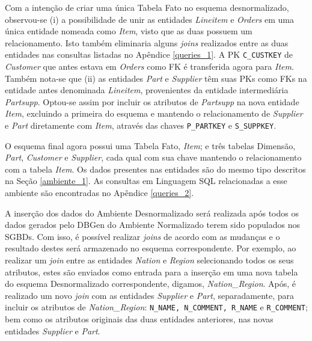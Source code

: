 Com a intenção de criar uma única Tabela Fato no esquema desnormalizado, observou-se (i) a possibilidade de unir as entidades \textit{Lineitem} e \textit{Orders} em uma única entidade nomeada como \textit{Item}, visto que as duas possuem um relacionamento. Isto também eliminaria alguns \textit{joins} realizados entre as duas entidades nas consultas listadas no Apêndice \ref{queries_1}. A PK \texttt{C\_CUSTKEY} de \textit{Customer} que antes estava em \textit{Orders} como FK é transferida agora para \textit{Item}. Também nota-se que (ii) as entidades \textit{Part} e \textit{Supplier} têm suas PKs como FKs na entidade antes denominada \textit{Lineitem}, provenientes da entidade intermediária \textit{Partsupp}. Optou-se assim por incluir os atributos de \textit{Partsupp} na nova entidade \textit{Item}, excluindo a primeira do esquema e mantendo o relacionamento de \textit{Supplier} e \textit{Part} diretamente com \textit{Item}, através das chaves \texttt{P\_PARTKEY} e \texttt{S\_SUPPKEY}.

O esquema final agora possui uma Tabela Fato, \textit{Item}; e três tabelas Dimensão, \textit{Part}, \textit{Customer} e \textit{Supplier}, cada qual com sua chave mantendo o relacionamento com a tabela \textit{Item}. Os dados presentes nas entidades são do mesmo tipo descritos na Seção \ref{ambiente_1}. As consultas em Linguagem SQL relacionadas a esse ambiente são encontradas no Apêndice \ref{queries_2}.

A inserção dos dados do Ambiente Desnormalizado será realizada após todos os dados gerados pelo DBGen do Ambiente Normalizado terem sido populados nos SGBDs. Com isso, é possível realizar \textit{joins} de acordo com as mudanças e o resultado destes será armazenado no esquema correspondente. Por exemplo, ao realizar um \textit{join} entre as entidades \textit{Nation} e \textit{Region} selecionando todos os seus atributos, estes são enviados como entrada para a inserção em uma nova tabela do esquema Desnormalizado correspondente, digamos, \textit{Nation\_Region}. Após, é realizado um novo \textit{join} com as entidades \textit{Supplier} e \textit{Part}, separadamente, para incluir os atributos de \textit{Nation\_Region}: \texttt{N\_NAME, N\_COMMENT, R\_NAME} e \texttt{R\_COMMENT}; bem como os atributos originais das duas entidades anteriores, nas novas entidades \textit{Supplier} e \textit{Part}.